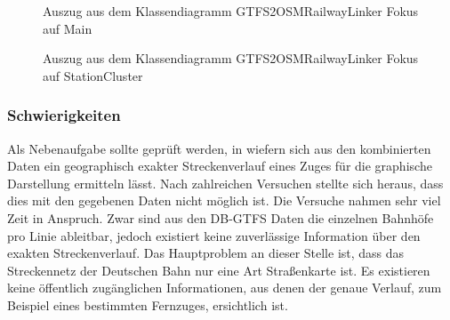 \begin{figure}[htb]
   \centering
   \caption{Auszug aus dem Klassendiagramm GTFS2OSMRailwayLinker Fokus auf Main}
   \label{fig:gtfs2osm:uml_main}
 \end{figure}


\begin{figure}[htb]
   \centering
   \caption{Auszug aus dem Klassendiagramm GTFS2OSMRailwayLinker Fokus auf StationCluster}
   \label{fig:gtfs2osm:uml_stationcluster}
 \end{figure}

\subsubsection{Schwierigkeiten}

Als Nebenaufgabe sollte geprüft werden, in wiefern sich aus den kombinierten Daten ein geographisch exakter Streckenverlauf eines Zuges für die graphische Darstellung ermitteln lässt.
Nach zahlreichen Versuchen stellte sich heraus, dass dies mit den gegebenen Daten nicht möglich ist.
Die Versuche nahmen sehr viel Zeit in Anspruch.
Zwar sind aus den DB-GTFS Daten die einzelnen Bahnhöfe pro Linie ableitbar, jedoch existiert keine zuverlässige Information über den exakten Streckenverlauf.
Das Hauptproblem an dieser Stelle ist, dass das Streckennetz der Deutschen Bahn nur eine Art Straßenkarte ist.
Es existieren keine öffentlich zugänglichen Informationen, aus denen der genaue Verlauf, zum Beispiel eines bestimmten Fernzuges, ersichtlich ist. 

